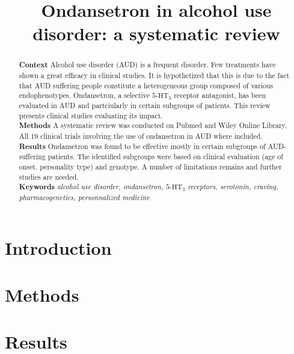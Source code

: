 \documentclass{article}
\title{Ondansetron in alcohol use disorder: a systematic review}
\author{}
\date{}
\begin{document}
\maketitle

\begin{abstract}
\textbf{Context} Alcohol use disorder (AUD) is a frequent disorder. Few treatments have shown a great efficacy in clinical studies. It is hypothetized that this is due to the fact that AUD suffering people constitute a heterogeneous group composed of various endophenotypes. Ondansetron, a selective $\text{5-HT}_3$ receptor antagonist, has been evaluated in AUD and partciularly in certain subgroups of patients. This review presents clinical studies evaluating its impact.\\ 
\textbf{Methods} A systematic review was conducted on Pubmed and Wiley Online Library. All 19 clinical trials involving the use of ondansetron in AUD where included.\\
\textbf{Results} Ondansetron was found to be effective mostly in certain subgroups of AUD-suffering patients. The identified subgroups were based on clinical evaluation (age of onset, personality type) and genotype. A number of limitations remains and further studies are needed.\\
\textbf{Keywords} \textit{alcohol use disorder, ondansetron, $\text{5-HT}_3$ receptors, serotonin, craving, pharmacogenetics, personnalized medicine}
\end{abstract}

\section*{Introduction}

\section*{Methods}

\section*{Results} 

\end{document}
